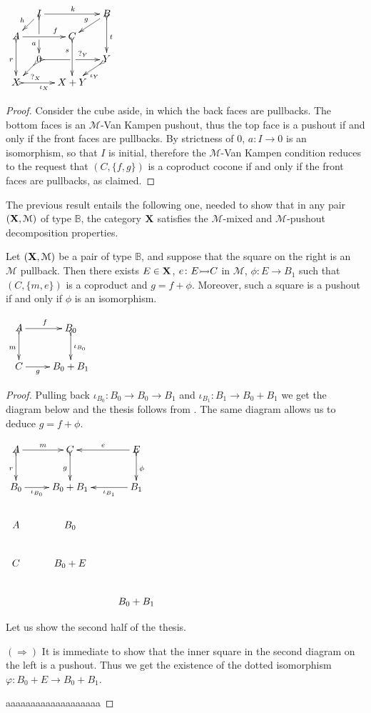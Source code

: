 \documentclass[a4paper,UKenglish,cleveref,pdftex,thm-restate,numberwithinsect,anonymous]{lipics}
\newcommand{\mto}[0]{\scalebox{1}{$\rightarrowtail$}}
\def\B{\textbf {\textup{B}}}
\def\C{\textbf {\textup{C}}}
\def\X{\textbf {\textup{X}}}
\begin{document}
\noindent 
\parbox{4cm}{$\xymatrix@C=10pt@R=10pt{&I\ar@{>->}[dd]|\hole_(.65){a}\ar[rr]^{k} \ar[dl]_{h} && B \ar@{>->}[dd]^{t} \ar[dl]_{g} \\ A  \ar@{>->}[dd]_{r}\ar[rr]^(.7){f} & & C \ar@{>->}[dd]_(.3){s}\\&0\ar@{>->}[rr]|\hole^(.65){?_Y} \ar@{>->}[dl]^{?_X} && Y \ar@{>->}[dl]^{\iota_Y} \\X \ar@{>->}[rr]_{\iota_X} & & X+Y}$}
 \parbox{10cm}{\begin{proof}
Consider the cube aside, in which the back faces are pullbacks. The bottom faces is an $\mathcal{M}$-Van Kampen pushout, thus the top face is a pushout if and only if the front faces are pullbacks. By strictness of $0$, $a\colon I\to 0$ is an isomorphism, so that $I$ is initial, therefore the $\mathcal{M}$-Van Kampen condition reduces to the request that $(C, \{f,g\})$ is a coproduct cocone if and only if the front faces are pullbacks, as claimed.
\end{proof}}

The previous result entails the following one, needed to show that  in any pair $(\X, \mathcal{M})$ of type $\mathbb{B}$, the category $\X$ satisfies the $\mathcal{M}$-mixed and $\mathcal{M}$-pushout decomposition properties.

\noindent
\parbox{10.7cm}{\begin{proposition}\label{prop:po2}
		Let $(\X, \mathcal{M})$ be a pair of type $\mathbb{B}$, and suppose that the square on the right is an $\mathcal{M}$ pullback. Then there exists $E\in \X$, $e\colon E\mto C$ in $\mathcal{M}$, $\phi:E\to B_1$ such that $(C, \{m, e\})$ is a coproduct and $g=f+\phi$. Moreover, such a square is a pushout if and only if $\phi$ is an isomorphism.
\end{proposition}} \parbox{3cm}{\vspace{-.2cm}$\xymatrix{A  \ar[r]^{f} \ar@{>->}[d]_{m}& B_0 \ar@{>->}[d]^{\iota_{B_{0}}}\\ C\ar[r]_-{g} & B_0+B_1}$}
\iffalse 
\begin{proof}
		Pulling back $\iota_{B_0}\colon B_0\to B_0\to B_1$ and $\iota_{B_1}\colon B_1\to B_0 + B_1$ we get the diagram below and the thesis follows from . The same diagram allows us to deduce $g=f+\phi$.	
	\parbox{5.2cm}{$\xymatrix{A\ar[r]^-{m} \ar@{>->}[d]_{r}& C  \ar@{>->}[d]_{g}& E \ar@{>->}[d]^{\phi}\ar[l]_-{e}\\B_0  \ar[r]_-{\iota_{B_0}}& B_0+B_1 & B_1 \ar[l]^-{\iota_{B_1}} \\ A & B_0 \\C & B_0+E\\ &&B_0+B_1}$}\parbox{8.8cm}{\vspace{-4.1cm}Let us show the second half of the thesis.
	
	$(\Rightarrow)$ It is immediate to show that the inner square in the second diagram on the left is a pushout. Thus we get the existence of the dotted isomorphism $\varphi\colon B_0+E\to B_0+B_1$.}
		
		\parbox{5cm}{aaaaaaaaaaaaaaaaaaa}
\end{proof}	
\end{document}

